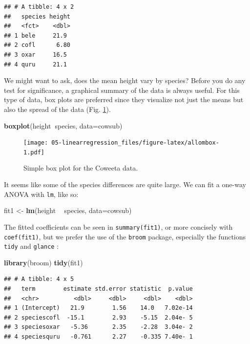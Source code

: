 \documentclass[]{book}
\newenvironment{Shaded}{\begin{snugshade}}{\end{snugshade}}
\newcommand{\DataTypeTok}[1]{\textcolor[rgb]{0.13,0.29,0.53}{#1}}
\newcommand{\KeywordTok}[1]{\textcolor[rgb]{0.13,0.29,0.53}{\textbf{#1}}}
\newcommand{\NormalTok}[1]{#1}
\newcommand{\OperatorTok}[1]{\textcolor[rgb]{0.81,0.36,0.00}{\textbf{#1}}}
\newcommand{\StringTok}[1]{\textcolor[rgb]{0.31,0.60,0.02}{#1}}
\begin{document}
\begin{verbatim}
## # A tibble: 4 x 2
##   species height
##   <fct>    <dbl>
## 1 bele     21.9 
## 2 cofl      6.80
## 3 oxar     16.5 
## 4 quru     21.1
\end{verbatim}

We might want to ask, does the mean height vary by species? Before you do any test for significance, a graphical summary of the data is always useful. For this type of data, box plots are preferred since they visualize not just the means but also the spread of the data (Fig. \ref{fig:allombox}).

\begin{Shaded}
\begin{Highlighting}[]
\KeywordTok{boxplot}\NormalTok{(height}\OperatorTok{~}\NormalTok{species, }\DataTypeTok{data=}\NormalTok{cowsub)}
\end{Highlighting}
\end{Shaded}

\begin{figure}
\centering
\texttt{[image: 05-linearregression\_files/figure-latex/allombox-1.pdf]}
\caption{\label{fig:allombox}Simple box plot for the Coweeta data.}
\end{figure}

It seems like some of the species differences are quite large. We can fit a one-way ANOVA with \texttt{lm}, like so:

\begin{Shaded}
\begin{Highlighting}[]
\NormalTok{fit1 <-}\StringTok{ }\KeywordTok{lm}\NormalTok{(height }\OperatorTok{~}\StringTok{ }\NormalTok{species, }\DataTypeTok{data=}\NormalTok{cowsub)}
\end{Highlighting}
\end{Shaded}

The fitted coefficients can be seen in \texttt{summary(fit1)}, or more concisely with \texttt{coef(fit1)}, but we prefer the use of the \texttt{broom} package, especially the functions \texttt{tidy} and \texttt{glance} :

\begin{Shaded}
\begin{Highlighting}[]
\KeywordTok{library}\NormalTok{(broom)}
\KeywordTok{tidy}\NormalTok{(fit1)}
\end{Highlighting}
\end{Shaded}

\begin{verbatim}
## # A tibble: 4 x 5
##   term        estimate std.error statistic  p.value
##   <chr>          <dbl>     <dbl>     <dbl>    <dbl>
## 1 (Intercept)   21.9        1.56    14.0   7.02e-14
## 2 speciescofl  -15.1        2.93    -5.15  2.04e- 5
## 3 speciesoxar   -5.36       2.35    -2.28  3.04e- 2
## 4 speciesquru   -0.761      2.27    -0.335 7.40e- 1
\end{verbatim}
\end{document}
